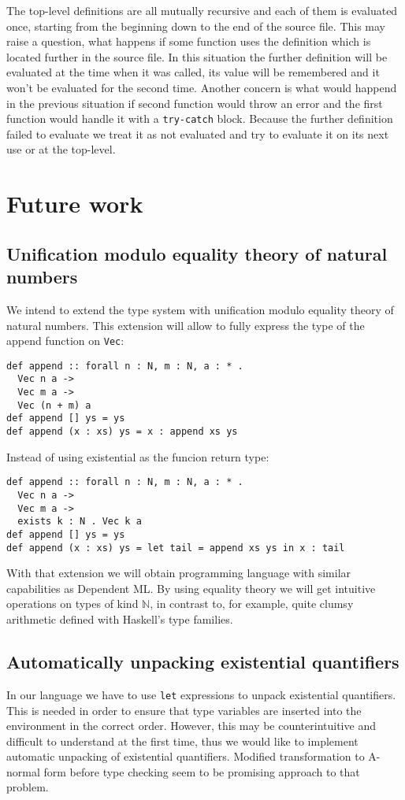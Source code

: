 \documentclass[declaration,shortabstract,english]{iithesis}
\begin{document}
The top-level definitions are all mutually recursive and each of them is evaluated once, starting from the beginning
down to the end of the source file. This may raise a question, what happens if some function uses the definition which is located
further in the source file. In this situation the further definition will be evaluated at the time when it was called,
its value will be remembered and it won't be evaluated for the second time.
Another concern is what would happend in the previous situation if second function would throw an error and the first function would
handle it with a \verb+try-catch+ block. Because the further definition failed to evaluate we treat it as not evaluated and try to evaluate it
on its next use or at the top-level.

\chapter{Future work}
\section{Unification modulo equality theory of natural numbers}
We intend to extend the type system with unification modulo equality theory of natural numbers.
This extension will allow to fully express the type of the append function on \verb+Vec+:
\begin{verbatim}
def append :: forall n : N, m : N, a : * .
  Vec n a ->
  Vec m a ->
  Vec (n + m) a
def append [] ys = ys
def append (x : xs) ys = x : append xs ys
\end{verbatim}
Instead of using existential as the funcion return type:
\begin{verbatim}
def append :: forall n : N, m : N, a : * .
  Vec n a ->
  Vec m a ->
  exists k : N . Vec k a
def append [] ys = ys
def append (x : xs) ys = let tail = append xs ys in x : tail
\end{verbatim}
With that extension we will obtain programming language with similar capabilities as
Dependent ML\cite{DependentML}. By using equality theory we will get intuitive operations
on types of kind $\mathbb{N}$, in contrast to, for example, quite clumsy arithmetic
defined with Haskell's type families.
\section{Automatically unpacking existential quantifiers}
In our language we have to use \verb+let+ expressions to unpack existential quantifiers.
This is needed in order to ensure that type variables are inserted into the environment in the correct order.
However, this may be counterintuitive and difficult to understand at the first time, thus
we would like to implement automatic unpacking of existential quantifiers.
Modified transformation to A-normal form before type checking seem to be promising approach to that problem.
\end{document}
